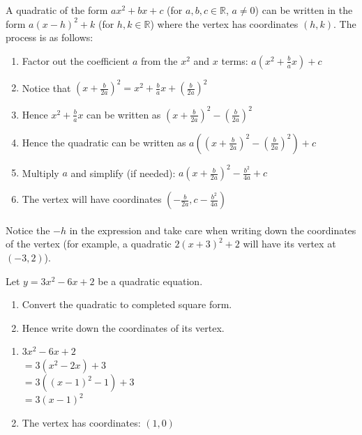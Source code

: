 \documentclass[12pt, a4paper, titlepage, twoside]{article}
\newcommand*{\R}{\mathbb{R}}
\newcounter{excount}[subsection]
\begin{document}
	\begin{kp}
		A quadratic of the form $ax^2 + bx + c$ (for $a,b,c \in \R$, $a \neq 0$) can be written in the form $a(x-h)^2 + k$ (for $h,k \in \R$)
		where the vertex has coordinates $(h,k)$. The process is as follows:
		
		\begin{enumerate}
			\item Factor out the coefficient $a$ from the $x^2$ and $x$ terms: $a(x^2 + \frac{b}{a}x) + c$
			\item Notice that $(x+\frac{b}{2a})^2 = x^2 + \frac{b}{a}x + (\frac{b}{2a})^2$
			\item Hence $x^2 + \frac{b}{a}x$ can be written as $(x+\frac{b}{2a})^2 - (\frac{b}{2a})^2$
			\item Hence the quadratic can be written as $a((x+\frac{b}{2a})^2 - (\frac{b}{2a})^2) + c$
			\item Multiply $a$ and simplify (if needed): $a(x+\frac{b}{2a})^2 - \frac{b^2}{4a} + c$
			\item The vertex will have coordinates $(-\frac{b}{2a}, c - \frac{b^2}{4a})$
		\end{enumerate}
	\end{kp}
	
	\paragraph{}
	Notice the $-h$ in the expression and take care when writing down the coordinates of the vertex (for example, a quadratic
	$2(x+3)^2 + 2$ will have its vertex at $(-3, 2)$).\\
	
	\begin{ex}
		Let $y = 3x^2 - 6x + 2$ be a quadratic equation.
		
		\begin{enumerate}[label=\textbf{(\alph*)}]
			\item Convert the quadratic to completed square form.
			\item Hence write down the coordinates of its vertex.
		\end{enumerate}
		
		\hfill
		\tcbline
		\hfill
		
		\begin{enumerate}[label=\textbf{(\alph*)}]
			\item $3x^2 - 6x + 2$\\
			
			$= 3(x^2 - 2x) + 3$\\
			
			$= 3((x-1)^2 - 1) + 3$\\
			
			$= 3(x-1)^2$

			\item The vertex has coordinates: $(1, 0)$ 
		\end{enumerate}
	\end{ex}
	
\end{document}
